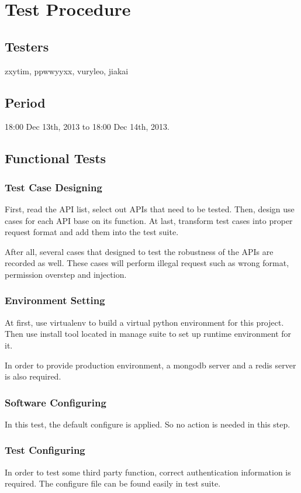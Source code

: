 \section{Test Procedure}
\label{sec:test_procedure}
  \subsection{Testers}
    zxytim, ppwwyyxx, vuryleo, jiakai
  \subsection{Period}
    18:00 Dec 13th, 2013 to 18:00 Dec 14th, 2013.
  \subsection{Functional Tests}
    \subsubsection{Test Case Designing}
      First, read the API list, select out APIs that need to be tested.
      Then, design use cases for each API base on its function.
      At last, transform test cases into proper request format and add them into the test suite.

      After all, several cases that designed to test the robustness of the APIs are recorded as well.
      These cases will perform illegal request such as wrong format, permission overstep and injection.
    \subsubsection{Environment Setting}
      At first, use virtualenv to build a virtual python environment for this project.
      Then use install tool located in manage suite to set up runtime environment for it.

      In order to provide production environment, a mongodb server and a redis server is also required.
    \subsubsection{Software Configuring}
      In this test, the default configure is applied. So no action is needed in this step.
    \subsubsection{Test Configuring}
      In order to test some third party function, correct authentication information is required.
      The configure file can be found easily in test suite.

